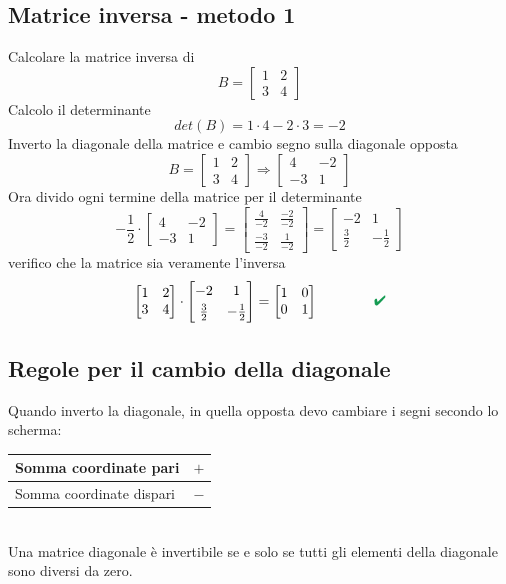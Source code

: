 \documentclass[italian]{article}
\renewcommand{\checkmark}{\textcolor{ForestGreen}{\text{$\qquad$\ding{52}}}}
\begin{document}
\subsection{Matrice inversa - metodo 1}
Calcolare la matrice inversa di
\[
	B =
	\begin{bmatrix}
		1 & 2 \\
		3 & 4
	\end{bmatrix}
\]
Calcolo il determinante
\[
	det(B) = 1 \cdot 4 - 2 \cdot 3 = -2
\]
Inverto la diagonale della matrice e cambio segno sulla diagonale opposta
\[
	B =
	\begin{bmatrix}
		1 & 2 \\
		3 & 4
	\end{bmatrix}
	\Rightarrow
	\begin{bmatrix}
		4 & -2 \\
		-3 & 1
	\end{bmatrix}
\]
Ora divido ogni termine della matrice per il determinante
\[
	-\frac{1}{2} \cdot
	\begin{bmatrix}
		4 & -2 \\
		-3 & 1
	\end{bmatrix}
	=
	\begin{bmatrix}
		\frac{4}{-2} & \frac{-2}{-2} \\[3mm]
		\frac{-3}{-2} & \frac{1}{-2}
	\end{bmatrix}
	=
	\begin{bmatrix}
		-2 & 1 \\[1mm]
		\frac{3}{2} & -\frac{1}{2}
	\end{bmatrix}
\]
verifico che la matrice sia veramente l'inversa
\[
	\begin{bmatrix}
		1 & 2 \\
		3 & 4
	\end{bmatrix}
	\cdot
	\begin{bmatrix}
		-2 & 1 \\[1mm]
		\frac{3}{2} & -\frac{1}{2}
	\end{bmatrix}
	=
	\begin{bmatrix}
		1 & 0 \\
		0 & 1
	\end{bmatrix}
	\qquad
	\checkmark
\]
\subsection{Regole per il cambio della diagonale}
Quando inverto la diagonale, in quella opposta devo cambiare i segni secondo lo scherma:
\begin{table}[h]
	\begin{tabular}{|l|l|}
		\hline
		Somma coordinate pari & \textbf{$+$} \\ \hline
		Somma coordinate dispari & \textbf{$-$} \\ \hline
	\end{tabular}
\end{table}\\
Una matrice diagonale è invertibile se e solo se tutti gli elementi della diagonale sono diversi da zero.
\end{document}
